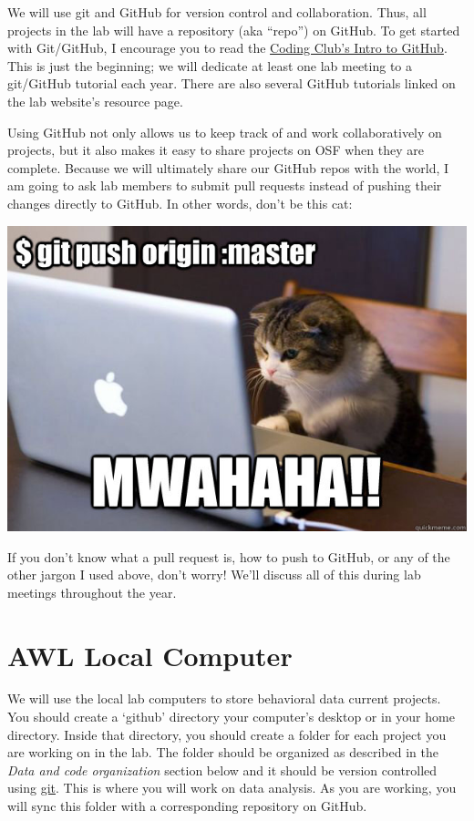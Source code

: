 \documentclass[]{book}
\begin{document}
We will use git and GitHub for version control and collaboration. Thus, all projects in the lab will have a repository (aka ``repo'') on GitHub. To get started with Git/GitHub, I encourage you to read the \href{https://ourcodingclub.github.io/2017/02/27/git.html}{Coding Club's Intro to GitHub}. This is just the beginning; we will dedicate at least one lab meeting to a git/GitHub tutorial each year. There are also several GitHub tutorials linked on the lab website's resource page.

Using GitHub not only allows us to keep track of and work collaboratively on projects, but it also makes it easy to share projects on OSF when they are complete. Because we will ultimately share our GitHub repos with the world, I am going to ask lab members to submit pull requests instead of pushing their changes directly to GitHub. In other words, don't be this cat:

\includegraphics{images/github.png}

If you don't know what a pull request is, how to push to GitHub, or any of the other jargon I used above, don't worry! We'll discuss all of this during lab meetings throughout the year.

\hypertarget{awl-local-computer}{%
\section{AWL Local Computer}\label{awl-local-computer}}

We will use the local lab computers to store behavioral data current projects. You should create a `github' directory your computer's desktop or in your home directory. Inside that directory, you should create a folder for each project you are working on in the lab. The folder should be organized as described in the \emph{Data and code organization} section below and it should be version controlled using \href{https://git-scm.com/}{git}. This is where you will work on data analysis. As you are working, you will sync this folder with a corresponding repository on GitHub.
\end{document}
